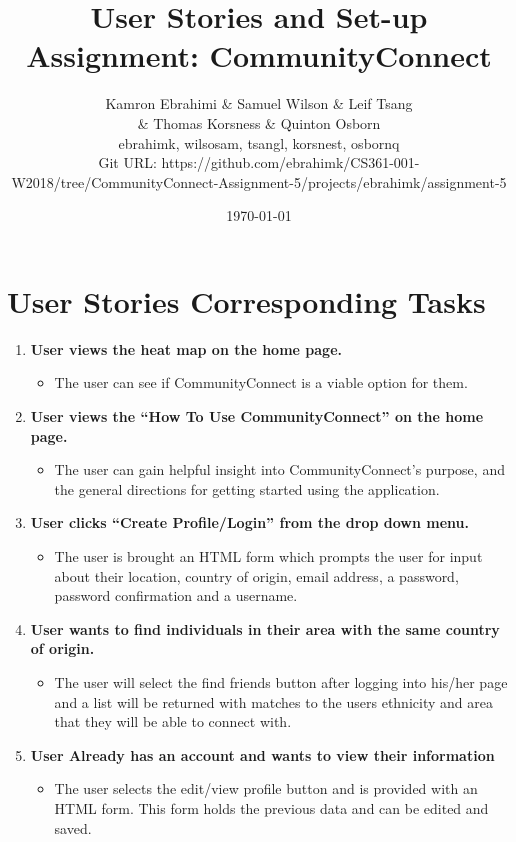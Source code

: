 \documentclass[12pt]{article}
\title{ User Stories and Set-up Assignment: CommunityConnect}
\author{Kamron Ebrahimi \& Samuel Wilson \& Leif Tsang \\ \& Thomas Korsness  \& Quinton Osborn \\ ebrahimk, wilsosam, tsangl, korsnest, osbornq \\ \scriptsize{Git URL: https://github.com/ebrahimk/CS361-001-W2018/tree/CommunityConnect-Assignment-5/projects/ebrahimk/assignment-5}}
\date{\today}
\begin{document}
\maketitle

\tableofcontents

\newpage
\section{\bf  User Stories Corresponding Tasks}
  \begin{enumerate}
    \item \textbf{User views the heat map on the home page.}
      \begin{itemize}
        \item The user can see if CommunityConnect is a viable option for them.
      \end{itemize}

    \item \textbf{User views the “How To Use CommunityConnect” on the home page.}
      \begin{itemize}
        \item The user can gain helpful insight into CommunityConnect’s purpose, and the general directions for getting started using the application.
      \end{itemize}

    \item \textbf{User clicks “Create Profile/Login” from the drop down menu.}
      \begin{itemize}
        \item The user is brought an HTML form which prompts the user for input about their location, country of origin, email address, a password, password confirmation and a username.
      \end{itemize}

    \item \textbf{User wants to find individuals in their area with the same country of origin.}
      \begin{itemize}
        \item The user will select the find friends button after logging into his/her page and a list will be returned with matches to the users ethnicity and area that they will be able to connect with.
      \end{itemize}

    \item \textbf{User Already has an account and wants to view their information}
      \begin{itemize}
        \item The user selects the edit/view profile button and is provided with an HTML form. This form holds the previous data and can be edited and saved.
      \end{itemize}


\end{enumerate}
\end{document}
